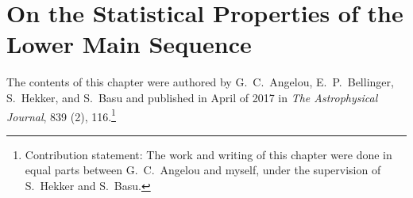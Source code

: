 









%


\chapter{On the Statistical Properties of the Lower Main Sequence}
\label{chap:statistical}

The contents of this chapter were authored 
by G.~C.~Angelou, E.~P.~Bellinger, S.~Hekker, and S.~Basu and published in April of 2017 in \emph{The Astrophysical Journal}, 839 (2), 116.\footnote{Contribution statement: The work and writing of this chapter were done in equal parts between G.~C.~Angelou and myself, under the supervision of S.~Hekker and S.~Basu.} 
\nocite{2017apj...839..116a} 

